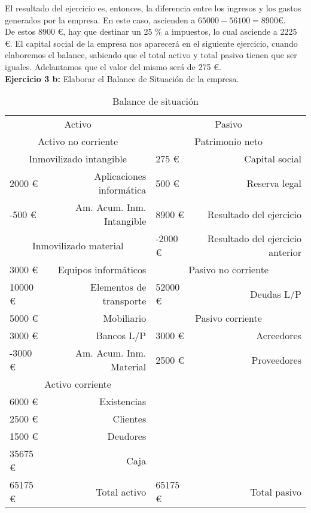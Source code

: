 \documentclass[11pt]{article}
\theoremstyle{plain}
\theoremstyle{definition}
\begin{document}
El resultado del ejercicio es, entonces, la diferencia entre los
ingresos y los gastos generados por la empresa. En este caso,
ascienden a $65000 - 56100 = 8900 $€.\\

De estos 8900 €, hay que destinar un 25 \% a impuestos, lo cual
asciende a 2225 €. El capital social de la empresa nos aparecerá en el
siguiente ejercicio, cuando elaboremos el balance, sabiendo que el
total activo y total pasivo tienen que ser iguales. Adelantamos que el
valor del mismo será de 275 €.\\

\textbf{Ejercicio 3 b:} Elaborar el Balance de Situación de la
empresa.\\

\begin{table}[H]
  \centering
  \begin{tabular}{lrlr}
    \toprule
    \multicolumn{2}{c}{Activo} & \multicolumn{2}{c}{Pasivo} \\
    \cmidrule(r){1-2} \cmidrule(l){3-4}
    \multicolumn{2}{c}{Activo no corriente} & \multicolumn{2}{c}{Patrimonio neto} \\
    \cmidrule(r){1-2} \cmidrule(l){3-4}
    \multicolumn{2}{c}{Inmovilizado intangible} & 275 € & Capital social\\
    \cmidrule(r){1-2}
    2000 € & Aplicaciones informática & 500 € & Reserva legal \\
    -500 € & Am. Acum. Inm. Intangible & 8900 € & Resultado del ejercicio \\
    \cmidrule(r){1-2}
    \multicolumn{2}{c}{Inmovilizado material} & -2000 € & Resultado del ejercicio anterior \\
    \cmidrule(r){1-2} \cmidrule(l){3-4}
    3000 € & Equipos informáticos & \multicolumn{2}{c}{Pasivo no corriente} \\
    \cmidrule(l){3-4}
    10000 € & Elementos de transporte & 52000 € & Deudas L/P \\
    \cmidrule(l){3-4}
    5000 € & Mobiliario & \multicolumn{2}{c}{Pasivo corriente} \\
    \cmidrule(l){3-4}
    3000 € & Bancos L/P & 3000 € & Acreedores \\
    -3000 € & Am. Acum. Inm. Material & 2500 € & Proveedores \\
    \cmidrule(r){1-2}
    \multicolumn{2}{c}{Activo corriente} & &  \\
    \cmidrule(r){1-2}
    6000 € & Existencias &  &  \\
    2500 € & Clientes & & \\
    1500 € & Deudores & & \\
    35675 € & Caja & & \\
    \midrule
    65175 € & Total activo & 65175 € & Total pasivo \\
    \bottomrule
  \end{tabular}
  \caption{Balance de situación}
\end{table}
\end{document}

